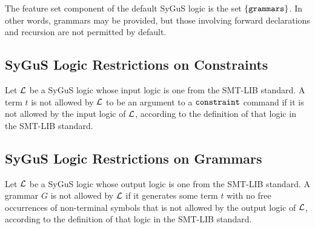 \documentclass[english,a4paper,10pt]{article}
\begin{document}
The feature set component of the default SyGuS logic is the set $\{ {\tt grammars} \}$.
In other words, grammars may be provided, but those involving
forward declarations and recursion are not permitted by default.

\subsection{SyGuS Logic Restrictions on Constraints}
\label{ssec:logicr-constraints}


Let $\mathcal{L}$ be a SyGuS logic whose input logic
is one from the SMT-LIB standard.
A term $t$ is not allowed by $\mathcal{L}$ 
to be an argument to a ${\tt constraint}$ command 
if it is not allowed by the input logic of $\mathcal{L}$, 
according to the definition of that logic in the SMT-LIB standard.



\subsection{SyGuS Logic Restrictions on Grammars}
\label{ssec:logicr-grammars}

Let $\mathcal{L}$ be a SyGuS logic whose output logic
is one from the SMT-LIB standard.
A grammar $G$ is not allowed by $\mathcal{L}$ if
it generates some term $t$ with 
no free occurrences of non-terminal
symbols that is not allowed by the output logic of $\mathcal{L}$,
according to the definition of that logic in the SMT-LIB standard.
\end{document}
